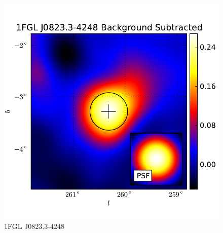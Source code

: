 \documentclass[preprint]{aastex}
\begin{document}
  \begin{figure}
    \begin{center}
      \includegraphics[type=pdf,ext=.pdf,read=.pdf]{source_plots/source_1FGL_J0823.3-4248}
    \end{center}
    \caption{1FGL J0823.3-4248}
  \end{figure}
\end{document}
